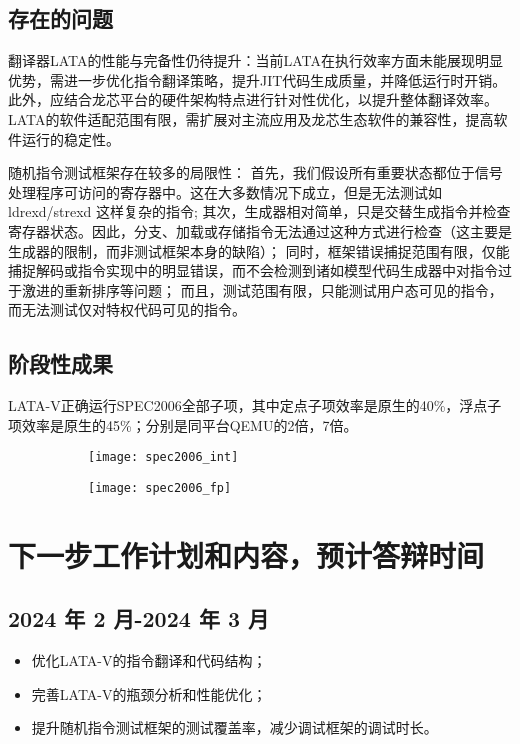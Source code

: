 \subsection{存在的问题}
翻译器LATA的性能与完备性仍待提升：当前LATA在执行效率方面未能展现明显优势，需进一步优化指令翻译策略，提升JIT代码生成质量，并降低运行时开销。此外，应结合龙芯平台的硬件架构特点进行针对性优化，以提升整体翻译效率。LATA的软件适配范围有限，需扩展对主流应用及龙芯生态软件的兼容性，提高软件运行的稳定性。

随机指令测试框架存在较多的局限性：
首先，我们假设所有重要状态都位于信号处理程序可访问的寄存器中。这在大多数情况下成立，但是无法测试如 ldrexd/strexd 这样复杂的指令;
其次，生成器相对简单，只是交替生成指令并检查寄存器状态。因此，分支、加载或存储指令无法通过这种方式进行检查（这主要是生成器的限制，而非测试框架本身的缺陷）；
同时，框架错误捕捉范围有限，仅能捕捉解码或指令实现中的明显错误，而不会检测到诸如模型代码生成器中对指令过于激进的重新排序等问题；
而且，测试范围有限，只能测试用户态可见的指令，而无法测试仅对特权代码可见的指令。

\subsection{阶段性成果}
LATA-V正确运行SPEC2006全部子项，其中定点子项效率是原生的40\%，浮点子项效率是原生的45\%；分别是同平台QEMU的2倍，7倍。
\begin{figure}[!htbp]
    \centering
    \begin{subfigure}[b]{1.0\textwidth}
        \centering
        \texttt{[image: spec2006\_int]}
        \caption{}
        \label{fig:oaspl_a}
    \end{subfigure}

    \vspace{1em} %

    \begin{subfigure}[b]{1.0\textwidth}
        \centering
        \texttt{[image: spec2006\_fp]}
        \caption{}
        \label{fig:oaspl_b}
    \end{subfigure}
\end{figure}

\section{下一步工作计划和内容，预计答辩时间}
\subsection*{2024 年 2 月-2024 年 3 月}
\begin{itemize}[left=0pt]
    \item 优化LATA-V的指令翻译和代码结构；
    \item 完善LATA-V的瓶颈分析和性能优化；
    \item 提升随机指令测试框架的测试覆盖率，减少调试框架的调试时长。
\end{itemize}

